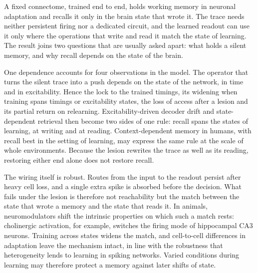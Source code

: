 
A fixed connectome, trained end to end, holds working memory in neuronal adaptation and recalls it only in the brain state
that wrote it. The trace needs neither persistent firing nor a dedicated circuit, and the learned readout can use it only where
the operations that write and read it match the state of learning. The result joins two questions that are usually asked
apart: what holds a silent memory, and why recall depends on the state of the brain.

One dependence accounts for four observations in the model. The operator that turns the silent trace into a push depends on
the state of the network, in time and in excitability. Hence the lock to the trained timings, its widening when training spans
timings or excitability states, the loss of access after a lesion and its partial return on relearning. Excitability-driven
decoder drift and state-dependent retrieval then become two sides of one
rule: recall spans the states of learning, at writing and at reading. Context-dependent memory in humans, with recall best in
the setting of learning, may express the same rule at the scale of whole environments. Because the lesion
rewrites the trace as well as its reading, restoring either end alone does not restore recall.

The wiring itself is robust. Routes from the input to the readout persist after heavy cell loss, and a single extra spike is
absorbed before the decision. What fails under the lesion is therefore not reachability but the match between the state that
wrote a memory and the state that reads it. In animals, neuromodulators shift the intrinsic properties on which such a match
rests: cholinergic activation, for example, switches the firing mode of hippocampal CA3 neurons. Training
across states widens the match, and cell-to-cell differences in adaptation leave the mechanism intact, in line with the
robustness that heterogeneity lends to learning in spiking networks. Varied conditions during learning
may therefore protect a memory against later shifts of state.


